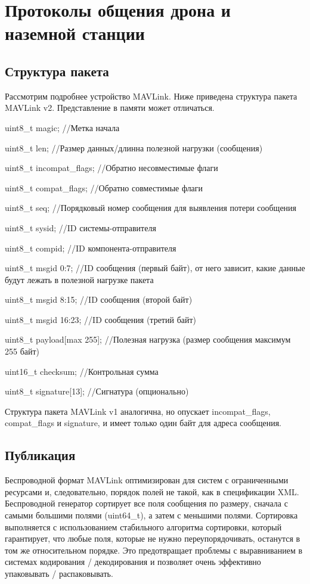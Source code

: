 
\section{Протоколы общения дрона и наземной станции}
\subsection{Структура пакета}
Рассмотрим подробнее устройство MAVLink. Ниже приведена структура пакета MAVLink v2. Представление в памяти может отличаться.

uint8\_t magic;              //Метка начала

uint8\_t len;                //Размер данных/длинна полезной нагрузки (сообщения)

uint8\_t incompat\_flags;     //Обратно несовместимые флаги

uint8\_t compat\_flags;       //Обратно совместимые флаги

uint8\_t seq;                //Порядковый номер сообщения для выявления потери сообщения

uint8\_t sysid;              //ID системы-отправителя

uint8\_t compid;             //ID компонента-отправителя

uint8\_t msgid 0:7;          //ID сообщения (первый байт), от него зависит, какие данные будут лежать в полезной нагрузке пакета

uint8\_t msgid 8:15;         //ID сообщения (второй байт)

uint8\_t msgid 16:23;        //ID сообщения (третий байт)

uint8\_t payload[max 255];   //Полезная нагрузка (размер сообщения максимум 255 байт) 

uint16\_t checksum;          //Контрольная сумма

uint8\_t signature[13];      //Сигнатура (опционально)

Структура пакета MAVLink v1 аналогична, но опускает incompat\_flags, compat\_flags и signature, и имеет только один байт для адреса сообщения.


\subsection{Публикация}
Беспроводной формат MAVLink оптимизирован для систем с ограниченными ресурсами и, следовательно, порядок полей не такой, как в спецификации XML. Беспроводной генератор сортирует все поля сообщения по размеру, сначала с самыми большими полями (uint64\_t), а затем с меньшими полями. Сортировка выполняется с использованием стабильного алгоритма сортировки, который гарантирует, что любые поля, которые не нужно переупорядочивать, останутся в том же относительном порядке. Это предотвращает проблемы с выравниванием в системах кодирования / декодирования и позволяет очень эффективно упаковывать / распаковывать.

